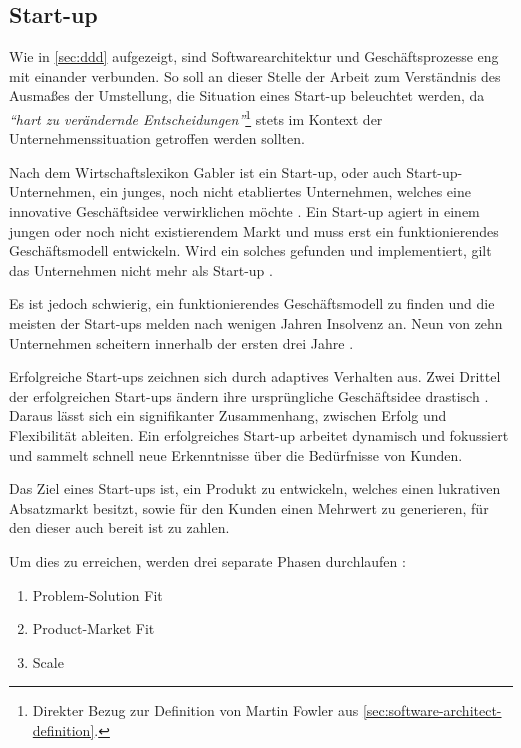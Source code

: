 \subsection{Start-up}
\label{sec:start-up}

Wie in \cref{sec:ddd} aufgezeigt, sind Softwarearchitektur und Geschäftsprozesse eng mit einander verbunden. So soll an dieser Stelle der Arbeit zum Verständnis des Ausmaßes der Umstellung, die Situation eines Start-up beleuchtet werden, da \textit{\enquote{hart zu verändernde Entscheidungen}}\footnote{Direkter Bezug zur Definition von Martin Fowler aus \cref{sec:software-architect-definition}.} stets im Kontext der Unternehmenssituation getroffen werden sollten.

Nach dem Wirtschaftslexikon Gabler ist ein Start-up, oder auch Start-up-Unternehmen, ein junges, noch nicht etabliertes Unternehmen, welches eine innovative Geschäftsidee verwirklichen möchte \parencite[vgl.][]{achleitner_start-up_2018}. Ein Start-up agiert in einem jungen oder noch nicht existierendem Markt und muss erst ein funktionierendes Geschäftsmodell entwickeln. Wird ein solches gefunden und implementiert, gilt das Unternehmen nicht mehr als Start-up \parencite[vgl.][]{wiki_start-up-unternehmen_2020}.

Es ist jedoch schwierig, ein funktionierendes Geschäftsmodell zu finden und die meisten der Start-ups melden nach  wenigen Jahren Insolvenz an. Neun von zehn Unternehmen scheitern innerhalb der ersten drei Jahre \parencite[vgl.][]{patel_startups-fail_2015}.

Erfolgreiche Start-ups zeichnen sich durch adaptives Verhalten aus. Zwei Drittel der erfolgreichen Start-ups ändern  ihre ursprüngliche Geschäftsidee drastisch \parencite{mullins_getting_2009}. Daraus lässt sich ein signifikanter Zusammenhang, zwischen Erfolg und Flexibilität ableiten. Ein erfolgreiches Start-up arbeitet dynamisch und fokussiert und sammelt schnell neue Erkenntnisse über die Bedürfnisse von Kunden.

Das Ziel eines Start-ups ist, ein Produkt zu entwickeln, welches einen lukrativen Absatzmarkt besitzt, sowie für den Kunden einen Mehrwert zu generieren, für den dieser auch bereit ist zu zahlen.

Um dies zu erreichen, werden drei separate Phasen durchlaufen \parencite[vgl.][S. 8 f.]{maurya_running_2012}: 
\begin{enumerate}
	\item Problem-Solution Fit
	\item Product-Market Fit
	\item Scale
\end{enumerate}

